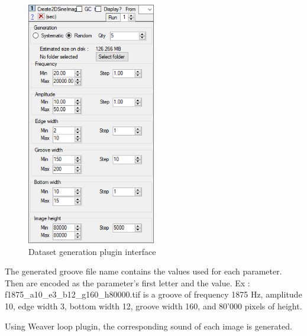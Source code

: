 \documentclass[12pt, twoside]{article}
\begin{document}
\begin{figure}
	\centering
	\includegraphics[width=0.5\textwidth]{../images/datasetplugin.png}
	\caption{Dataset generation plugin interface}
	\label{dsplugin}
\end{figure}

The generated groove file name contains the values used for each parameter. Then are encoded as the parameter's first letter and the value. Ex : f1875\_a10\_e3\_b12\_g160\_h80000.tif is a groove of frequency 1875 Hz, amplitude 10, edge width 3, bottom width 12, groove width 160, and 80'000 pixels of height.

Using Weaver loop plugin, the corresponding sound of each image is generated.
\end{document}
